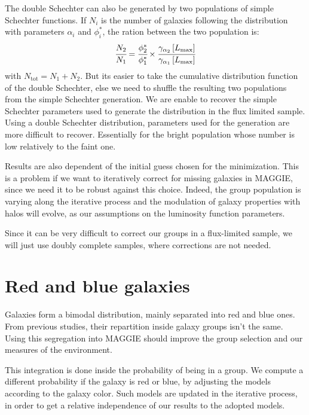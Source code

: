 {    The double Schechter can also be generated by two populations of simple
    Schechter functions. If $N_i$ is the number of galaxies following the
    distribution with parameters $\alpha_i$ and $\phi_i^*$, the ration between
    the two population is:
    \begin{equation}
        \cfrac{N_2}{N_1} =
        \cfrac{\phi_2^*}{\phi_1^*}\times
        \cfrac{\gamma_{\alpha_2} \left[L_{\max}\right]}
            {\gamma_{\alpha_1} \left[L_{\max}\right]}
    \end{equation}
    with $N_\mathrm{tot}=N_1+N_2$. But its easier to take the cumulative
    distribution function of the double Schechter, else we need to shuffle the
    resulting two populations from the simple Schechter generation.
}
%
We are enable to recover the simple Schechter parameters used to generate the
distribution in the flux limited sample. Using a double Schechter distribution,
parameters used for the generation are more difficult to recover. Essentially
for the bright population whose number is low relatively to the faint one.

Results are also dependent of the initial guess chosen for the minimization.
This is a problem if we want to iteratively correct for missing galaxies in
MAGGIE, since we need it to be robust against this choice. Indeed, the group
population is varying along the iterative process and the modulation of galaxy
properties with halos will evolve, as our assumptions on the luminosity
function parameters.

Since it can be very difficult to correct our groups in a flux-limited sample,
we will just use doubly complete samples, where corrections are not needed.

\section{Red and blue galaxies}

Galaxies form a bimodal distribution, mainly separated into red and blue ones.
From previous studies, their repartition inside galaxy groups isn't the same.
Using this segregation into MAGGIE should improve the group selection and our
measures of the environment.

This integration is done inside the probability of being in a group. We compute
a different probability if the galaxy is red or blue, by adjusting the models
according to the galaxy color. Such models are updated in the iterative
process, in order to get a relative independence of our results to the adopted
models.

